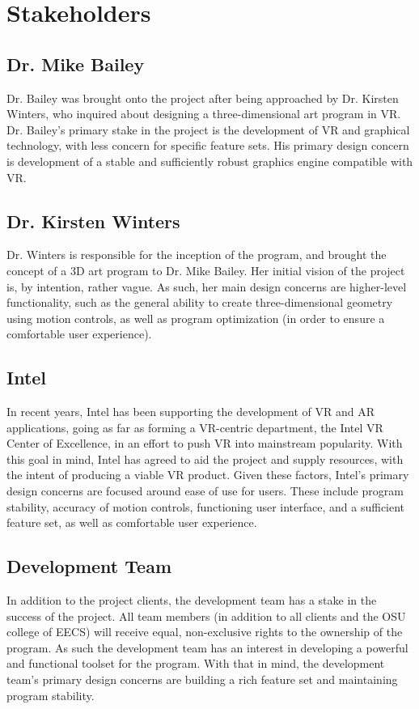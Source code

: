 \documentclass[onecolumn, draftclsnofoot,10pt, compsoc]{IEEEtran}
\begin{document}
\section{Stakeholders}

\subsection{Dr. Mike Bailey}
Dr. Bailey was brought onto the project after being approached by Dr. Kirsten Winters, who inquired about designing a three-dimensional art program in VR. Dr. Bailey’s primary stake in the project is the development of VR and graphical technology, with less concern for specific feature sets. His primary design concern is development of a stable and sufficiently robust graphics engine compatible with VR.
\subsection{Dr. Kirsten Winters}
Dr. Winters is responsible for the inception of the program, and brought the concept of a 3D art program to Dr. Mike Bailey. Her initial vision of the project is, by intention, rather vague. As such, her main design concerns are higher-level functionality, such as the general ability to create three-dimensional geometry using motion controls, as well as program optimization (in order to ensure a comfortable user experience).
\subsection{Intel}
In recent years, Intel has been supporting the development of VR and AR applications, going as far as forming a VR-centric department, the Intel VR Center of Excellence, in an effort to push VR into mainstream popularity. With this goal in mind, Intel has agreed to aid the project and supply resources, with the intent of producing a viable VR product. Given these factors, Intel’s primary design concerns are focused around ease of use for users. These include program stability, accuracy of motion controls, functioning user interface, and a sufficient feature set, as well as comfortable user experience. 
\subsection{Development Team}
In addition to the project clients, the development team has a stake in the success of the project. All team members (in addition to all clients and the OSU college of EECS) will receive equal, non-exclusive rights to the ownership of the program. As such the development team has an interest in developing a powerful and functional toolset for the program. With that in mind, the development team’s primary design concerns are building a rich feature set and maintaining program stability.
\end{document}

